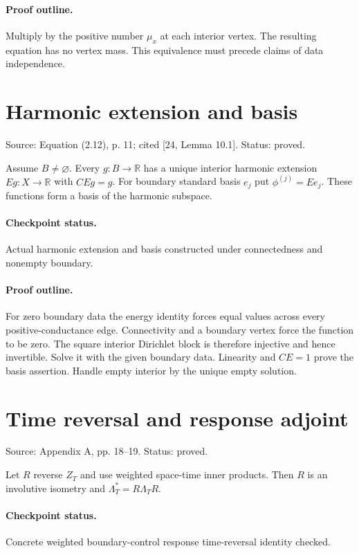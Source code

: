 \paragraph{Proof outline.}

Multiply by the positive number $\mu_x$ at each interior vertex. The resulting equation has no vertex mass. This equivalence must precede claims of data independence.
\nodebreak
\section{Harmonic extension and basis}
Source: Equation (2.12), p. 11; cited [24, Lemma 10.1]. Status: proved.
\begin{lemma}\label{dirichlet}

Assume $B\ne\varnothing$. Every $g:B\to\mathbb R$ has a unique interior harmonic extension $Eg:X\to\mathbb R$ with $CEg=g$. For boundary standard basis $e_j$ put $\phi^{(j)}=Ee_j$. These functions form a basis of the harmonic subspace.


\paragraph{Checkpoint status.}
Actual harmonic extension and basis constructed under connectedness and nonempty boundary.
\end{lemma}
\paragraph{Proof outline.}

For zero boundary data the energy identity forces equal values across every positive-conductance edge. Connectivity and a boundary vertex force the function to be zero. The square interior Dirichlet block is therefore injective and hence invertible. Solve it with the given boundary data. Linearity and $CE=1$ prove the basis assertion. Handle empty interior by the unique empty solution.
\nodebreak
\section{Time reversal and response adjoint}
Source: Appendix A, pp. 18–19. Status: proved.
\begin{lemma}\label{response-adjoint}

Let $R$ reverse $Z_T$ and use weighted space-time inner products. Then $R$ is an involutive isometry and $\Lambda_T^*=R\Lambda_TR$.


\paragraph{Checkpoint status.}
Concrete weighted boundary-control response time-reversal identity checked.
\end{lemma}
